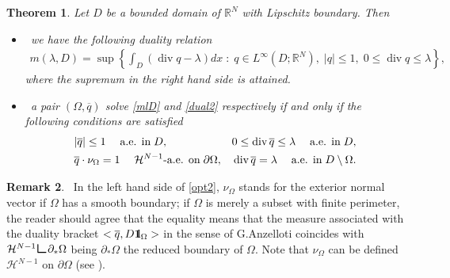 \documentclass[reqno,11pt]{amsart}
\newtheorem{theorem}{Theorem}[section]
\theoremstyle{definition}
\newtheorem{remark}[theorem]{Remark}
\numberwithin{equation}{section}
\def\ov{\overline}
\DeclareMathOperator{\Div}{div}
\newcommand{\HH}{\mathcal{H}}
\newcommand{\RR}{\mathbb{R}}
\def\R{\mathbb{R}}
\newcommand{\tinm}[1]{\text{\;#1\;}}
\newcommand{\1}{{{\bf 1}\kern-0,28em\rm l}}
\newcommand{\one}{{{\bf 1}\kern-0,28em\rm l}}
\def\sepa{\; : \;}
\newcommand{\aco}[1]{\left\{#1\right\}}
\def\res{\text{\huge$\llcorner$}}
\def\O{\Omega}
\begin{document}
\begin{theorem}\label{duality2}
Let $D$ be a bounded domain of $\R^N$ with Lipschitz boundary. Then 

\begin{itemize}
\item [(i)]\  we have the following duality relation
\begin{align}
 m(\lambda,D)=\sup \aco{\int_D (\Div q -\lambda) dx \sepa q\in L^\infty(D;\RR^N),\; |q|\le 1,\; 0 \le \Div q \le \lambda } ,  \label{dual2}
\end{align}
where  the supremum in the right hand side is attained. 

\item [(ii)]\ a pair $(\O,\ov q)$ solve \eqref{mlD} and \eqref{dual2} respectively if and only if the following conditions are satisfied
\begin{align}
& |\ov q| \le 1 \quad\tinm{a.e. in} D, && 0 \le \Div \ov  q \le \lambda \quad\tinm{a.e. in} D,\label{opt1}\\
&  \ov q\cdot \nu_{\Omega} =1 \quad\tinm{$\HH^{N-1}$-a.e. on} \partial\Omega,  && \Div \ov  q =\lambda \quad\tinm{a.e. in} D\setminus \Omega.\label{opt2}
\end{align}
\end{itemize}
\end{theorem}

\begin{remark}\label{trace} \ In the left hand side of \eqref{opt2}, $\nu_\O$ stands for the exterior normal vector if $\O$ has a smooth boundary;
if $\O$ is merely a subset with finite perimeter, the reader should agree that the equality means that the measure associated with the duality bracket
$< \ov q,  D\one_\O>$ in the sense of G.Anzelloti \cite{Anzelloti1984} coincides with  $\HH^{N-1}\res \partial_* \Omega$ being $\partial_* \Omega$ the reduced boundary of $\Omega$. Note that $\nu_\O$ can be defined  $\HH^{N-1}$ on  $ \partial \O$ (see \cite{EG}). 


\end{remark}
\end{document}
